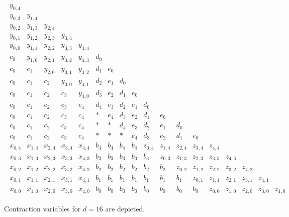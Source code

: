 \begin{figure}[H]
    \begin{align*}
        \begin{array}{cccccccccccccccccccc}
            y_{0,4} & & & & & & & & & & & & \\
            y_{0,3} & y_{1,4} & & & & & & & & & & & \\
            y_{0,2} & y_{1,3} & y_{2,4} & & & & & & & & & & \\
            y_{0,1} & y_{1,2} & y_{2,3} & y_{3,4} & & & & & & & & & \\
            y_{0,0} & y_{1,1} & y_{2,2} & y_{3,3} & y_{4,4} & & & & & & & & \\
            c_0 & y_{1,0} & y_{2,1} & y_{3,2} & y_{4,3} & d_0 & & & & & & & \\
            c_0 & c_1 & y_{2,0} & y_{3,1} & y_{4,2} & d_1 & e_0 & & & & & & \\
            c_0 & c_1 & c_2 & y_{3,0} & y_{4,1} & d_2 & e_1 & d_0 & & & & & \\
            c_0 & c_1 & c_2 & c_3 &  y_{4,0}  & d_3 & e_2 & d_1 & e_0 & & & & \\
            c_0 & c_1 & c_2 & c_3 &  c_4  & d_4 & e_3 & d_2 & e_1 & d_0 & & & \\
            c_0 & c_1 & c_2 & c_3 &  c_4  & * & e_4 & d_3 & e_2 & d_1 & e_0 & & \\
            c_0 & c_1 & c_2 & c_3 &  c_4  & * & * & d_4 & e_3 & d_2 & e_1 & d_0 & \\
            c_0 & c_1 & c_2 & c_3 &  c_4  & * & * & * & e_4 & d_3 & e_2 & d_1 & e_0 \\
            x_{0,4} & x_{1,4} & x_{2,4} & x_{3,4} &  x_{4,4}  & b_4 & b_4 & b_4 & b_4 & z_{0,4} & z_{1,4} & z_{2,4} & z_{3,4} & z_{4,4} \\
            x_{0,3} & x_{1,3} & x_{2,3} & x_{3,3} & x_{4,3} & b_3 & b_3 & b_3 & b_3 & b_3 & z_{0,3} & z_{1,3} & z_{2,3} & z_{3,3} & z_{4,3} \\
            x_{0,2} & x_{1,2} & x_{2,2} & x_{3,2} & x_{4,2} & b_2 & b_2 & b_2 & b_2 & b_2 & b_2 & z_{0,2} & z_{1,2} & z_{2,2} & z_{3,2} & z_{4,2}\\
            x_{0,1} & x_{1,1} & x_{2,1} & x_{3,1} & x_{4,1} & b_1 & b_1 & b_1 & b_1 & b_1 & b_1 & b_1 & z_{0,1} & z_{1,1} & z_{2,1} & z_{3,1} & z_{4,1} \\
            x_{0,0} & x_{1,0} & x_{2,0} & x_{3,0} & x_{4,0} & b_0 & b_0 & b_0 & b_0 & b_0 & b_0 & b_0 & b_0 & z_{0,0} & z_{1,0} & z_{2,0} & z_{3,0} & z_{4,0}
        \end{array}
    \end{align*}  
    \caption{Contraction variables for \( d = 16 \) are depicted.}\label{fig:sjdnfkjewnjhwurhi3u2h}
\end{figure}

